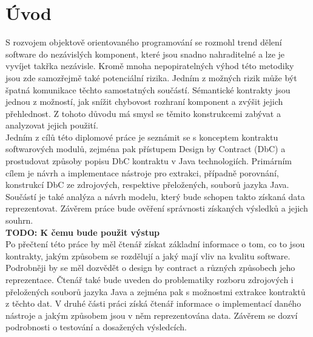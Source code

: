 \chapter{Úvod}

S rozvojem objektově orientovaného programování se rozmohl trend dělení software do nezávislých komponent, které jsou snadno nahraditelné a lze je vyvíjet takřka nezávisle. Kromě mnoha nepopiratelných výhod této metodiky jsou zde samozřejmě také potenciální rizika. Jedním z možných rizik může být špatná komunikace těchto samostatných součástí. Sémantické kontrakty jsou jednou z možností, jak snížit chybovost rozhraní komponent a zvýšit jejich přehlednost. Z tohoto důvodu má smysl se těmito konstrukcemi zabývat a analyzovat jejich použití.\\

Jedním z cílů této diplomové práce je seznámit se s konceptem kontraktu softwarových modulů, zejména pak přístupem Design by Contract (DbC) a prostudovat způsoby popisu DbC kontraktu v Java technologiích. Primárním cílem je návrh a implementace nástroje pro extrakci, případně porovnání, konstrukcí DbC ze zdrojových, respektive přeložených, souborů jazyka Java. Součástí je také analýza a návrh modelu, který bude schopen takto získaná data reprezentovat. Závěrem práce bude ověření správnosti získaných výsledků a jejich souhrn.\\ 

\textbf{\textcolor{pblue}{TODO: K čemu bude použit výstup}}\\

Po přečtení této práce by měl čtenář získat základní informace o tom, co to jsou kontrakty, jakým způsobem se rozdělují a jaký mají vliv na kvalitu software. Podrobněji by se měl dozvědět o design by contract a různých způsobech jeho reprezentace. Čtenář také bude uveden do problematiky rozboru zdrojových i přeložených souborů jazyka Java a zejména pak s možnostmi extrakce kontraktů z těchto dat. V druhé části práci získá čtenář informace o implementací daného nástroje a jakým způsobem jsou v něm reprezentována data. Závěrem se dozví podrobnosti o testování a dosažených výsledcích.
